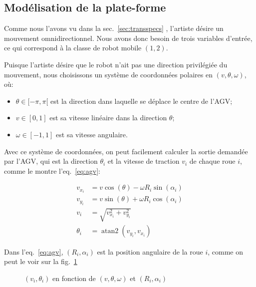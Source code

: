 \documentclass[french,A4paper,]{book}
\providecommand{\tightlist}{%
  \setlength{\itemsep}{0pt}\setlength{\parskip}{0pt}}
\begin{document}
\subsection{Modélisation de la plate-forme}\label{sec:transmodel}

Comme nous l'avons vu dans la sec.~\ref{sec:transspecs} , l'artiste
désire un mouvement omnidirectionnel. Nous avons donc besoin de trois
variables d'entrée, ce qui correspond à la classe de robot mobile
\((1, 2)\).

Puisque l'artiste désire que le robot n'ait pas une direction
privilégiée du mouvement, nous choisissons un système de coordonnées
polaires en \((v, \theta, \omega)\), où:

\begin{itemize}
\tightlist
\item
  \(\theta \in [-\pi, \pi[\) est la direction dans laquelle se déplace
  le centre de l'AGV;
\item
  \(v \in [0, 1]\) est sa vitesse linéaire dans la direction \(\theta\);
\item
  \(\omega \in [-1, 1]\) est sa vitesse angulaire.
\end{itemize}

Avec ce système de coordonnées, on peut facilement calculer la sortie
demandée par l'AGV, qui est la direction \(\theta_i\) et la vitesse de
traction \(v_i\) de chaque roue \(i\), comme le montre
l'eq.~\ref{eq:agv}:

\begin{equation} \begin{aligned}
    v_{x_i} &= v \cos(\theta)- \omega R_i \sin(\alpha_i) \\
    v_{y_i} &= v \sin(\theta)+ \omega R_i \cos(\alpha_i) \\
    v_i &= \sqrt{v_{x_i}^2 + v_{y_i}^2} \\
    \theta_i &= \operatorname{atan2}(v_{y_i}, v_{x_i})
\end{aligned} \label{eq:agv}\end{equation}

Dans l'eq.~\ref{eq:agv}, \((R_i, \alpha_i)\) est la position angulaire
de la roue \(i\), comme on peut le voir sur la fig.~\ref{fig:octogons}

\begin{figure}
\centering

\hspace*{\fill}
\hfill%
\hspace*{\fill}

\caption{\((v_i, \theta_i)\) en fonction de \((v, \theta, \omega)\) et
\((R_i, \alpha_i)\)}

\label{fig:octogons}

\end{figure}
\end{document}
